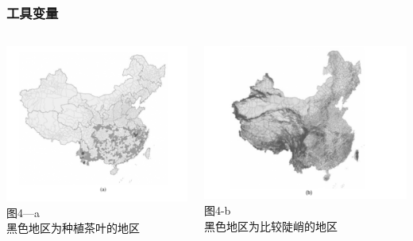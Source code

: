 \documentclass{beamer}
\begin{document}
\begin{frame}
    \frametitle{工具变量}
     \begin{columns}
            \begin{minipage}[c][0.4\textheight][c]{\linewidth}
                \centering
                \includegraphics[scale=0.3]{figure4_a}
            图4—a 
            \\黑色地区为种植茶叶的地区
            \end{minipage}
          
            \begin{minipage}[c][0.4\textheight][c]{\linewidth}
                \centering
                \includegraphics[scale=0.3]{figure4_b}
            图4-b
            \\黑色地区为比较陡峭的地区
            \end{minipage}
    \end{columns} 
\end{frame}
\end{document}

